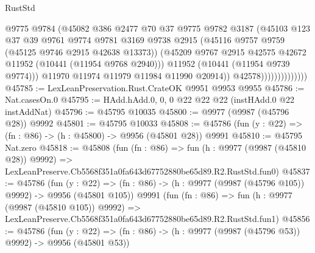 \begin{lexlean}{RustStd}
\begin{coremodule}
                                  @9775
                                  @9784
                                  (@45082
                                    @386
                                    @2477
                                    @70
                                    @37
                                    @9775
                                    @9782
                                    @3187
                                    (@45103
                                      @123
                                      @37
                                      @39
                                      @9761
                                      @9774
                                      @9781
                                      @3169
                                      @9738
                                      @2915
                                      (@45116 @9757 @9759 (@45125 @9746 @2915 @42638 @13373))
                                      (@45209
                                        @9767
                                        @2915
                                        @42575
                                        @42672
                                        @11952
                                        (@10441 (@11954 @9768 @2940)))
                                      @11952
                                      (@10441 (@11954 @9739 @9774)))
                                    @11970
                                    @11974
                                    @11979
                                    @11984
                                    @11990
                                    @20914))
                                @42578))))))))))))))
@45785 := LexLeanPreservation.Rust.CrateOK @9951 @9953 @9955
@45786 := Nat.casesOn.{0}
@45795 := HAdd.hAdd.{0, 0, 0} @22 @22 @22 (instHAdd.{0} @22 instAddNat)
@45796 := @45795 @10035
@45800 := @9977 (@9987 (@45796 @28)) @9992
@45801 := @45795 @10033
@45808 := @45786 (fun (y : @22) => (fn : @86) -> (h : @45800) -> @9956 (@45801 @28)) @9991
@45810 := @45795 Nat.zero
@45818 := @45808
    (fun (fn : @86) =>
    fun (h : @9977 (@9987 (@45810 @28)) @9992) =>
    LexLeanPreserve.Cb5568f351a0fa643d67752880be65d89.R2.RustStd.fun0)
@45837 := @45786
    (fun (y : @22) => (fn : @86) -> (h : @9977 (@9987 (@45796 @105)) @9992) -> @9956 (@45801 @105))
    @9991
    (fun (fn : @86) =>
    fun (h : @9977 (@9987 (@45810 @105)) @9992) =>
    LexLeanPreserve.Cb5568f351a0fa643d67752880be65d89.R2.RustStd.fun1)
@45856 := @45786
    (fun (y : @22) => (fn : @86) -> (h : @9977 (@9987 (@45796 @53)) @9992) -> @9956 (@45801 @53))

\end{coremodule}
\end{lexlean}
